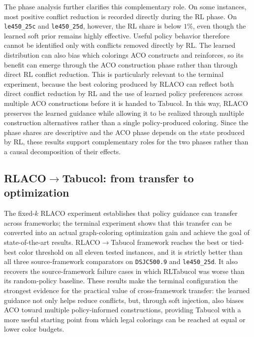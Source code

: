 The phase analysis further clarifies this complementary role. On some
instances, most positive conflict reduction is recorded directly during the RL
phase. On \texttt{le450\_25c} and \texttt{le450\_25d}, however, the RL share
is below $1\%$, even though the learned soft prior remains highly effective.
Useful policy behavior therefore cannot be identified only with conflicts
removed directly by RL. The learned distribution can also bias which
colorings ACO constructs and reinforces, so its benefit can emerge through the
ACO construction phase rather than through direct RL conflict reduction. This is particularly relevant to the terminal experiment, because the best coloring produced by RLACO can reflect both direct conflict reduction by RL and the use of learned policy preferences across multiple ACO constructions before it is handed to Tabucol. In this way, RLACO preserves the learned guidance while allowing it to be realized through multiple construction alternatives rather than a single policy-produced coloring. Since the phase shares are descriptive and the ACO phase depends on the state produced by RL, these results support complementary roles for the two phases rather than a causal decomposition of their effects.

\subsection{RLACO$\rightarrow$Tabucol: from transfer to optimization}
\label{ssec:discussion-terminal}

The fixed-$k$ RLACO experiment establishes that policy guidance can transfer across frameworks; the terminal experiment shows that this transfer can be converted into an actual graph-coloring optimization gain and achieve the goal of state-of-the-art results. RLACO$\rightarrow$Tabucol framework reaches the best or tied-best color threshold on all eleven tested instances, and it is strictly better than all three source-framework comparators on \texttt{DSJC500.9} and \texttt{le450\_25d}. It also recovers the source-framework failure cases in which RLTabucol was worse than its random-policy baseline. These results make the terminal configuration the strongest evidence for the practical value of cross-framework transfer: the learned guidance not only helps reduce conflicts, but, through soft injection, also biases ACO toward multiple policy-informed constructions, providing Tabucol with a more useful starting point from which legal colorings can be reached at equal or lower color budgets.

